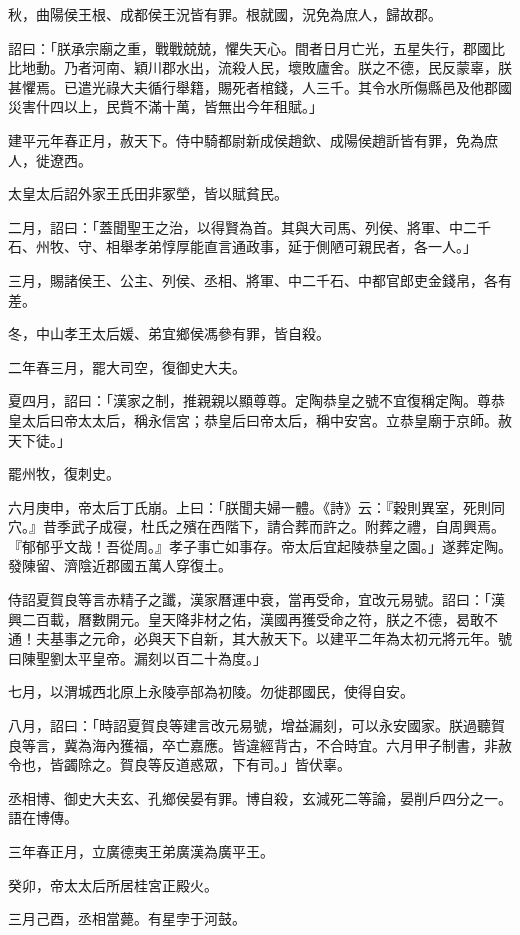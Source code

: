 \begin{pinyinscope}
秋，曲陽侯王根、成都侯王況皆有罪。根就國，況免為庶人，歸故郡。

詔曰：「朕承宗廟之重，戰戰兢兢，懼失天心。間者日月亡光，五星失行，郡國比比地動。乃者河南、穎川郡水出，流殺人民，壞敗廬舍。朕之不德，民反蒙辜，朕甚懼焉。已遣光祿大夫循行舉籍，賜死者棺錢，人三千。其令水所傷縣邑及他郡國災害什四以上，民貲不滿十萬，皆無出今年租賦。」

建平元年春正月，赦天下。侍中騎都尉新成侯趙欽、成陽侯趙訢皆有罪，免為庶人，徙遼西。

太皇太后詔外家王氏田非冢塋，皆以賦貧民。

二月，詔曰：「蓋聞聖王之治，以得賢為首。其與大司馬、列侯、將軍、中二千石、州牧、守、相舉孝弟惇厚能直言通政事，延于側陋可親民者，各一人。」

三月，賜諸侯王、公主、列侯、丞相、將軍、中二千石、中都官郎吏金錢帛，各有差。

冬，中山孝王太后媛、弟宜鄉侯馮參有罪，皆自殺。

二年春三月，罷大司空，復御史大夫。

夏四月，詔曰：「漢家之制，推親親以顯尊尊。定陶恭皇之號不宜復稱定陶。尊恭皇太后曰帝太太后，稱永信宮；恭皇后曰帝太后，稱中安宮。立恭皇廟于京師。赦天下徒。」

罷州牧，復刺史。

六月庚申，帝太后丁氏崩。上曰：「朕聞夫婦一體。《詩》云：『穀則異室，死則同穴。』昔季武子成寑，杜氏之殯在西階下，請合葬而許之。附葬之禮，自周興焉。『郁郁乎文哉！吾從周。』孝子事亡如事存。帝太后宜起陵恭皇之園。」遂葬定陶。發陳留、濟陰近郡國五萬人穿復土。

侍詔夏賀良等言赤精子之讖，漢家曆運中衰，當再受命，宜改元易號。詔曰：「漢興二百載，曆數開元。皇天降非材之佑，漢國再獲受命之符，朕之不德，曷敢不通！夫基事之元命，必與天下自新，其大赦天下。以建平二年為太初元將元年。號曰陳聖劉太平皇帝。漏刻以百二十為度。」

七月，以渭城西北原上永陵亭部為初陵。勿徙郡國民，使得自安。

八月，詔曰：「時詔夏賀良等建言改元易號，增益漏刻，可以永安國家。朕過聽賀良等言，冀為海內獲福，卒亡嘉應。皆違經背古，不合時宜。六月甲子制書，非赦令也，皆蠲除之。賀良等反道惑眾，下有司。」皆伏辜。

丞相博、御史大夫玄、孔鄉侯晏有罪。博自殺，玄減死二等論，晏削戶四分之一。語在博傳。

三年春正月，立廣德夷王弟廣漢為廣平王。

癸卯，帝太太后所居桂宮正殿火。

三月己酉，丞相當薨。有星孛于河鼓。


\end{pinyinscope}
